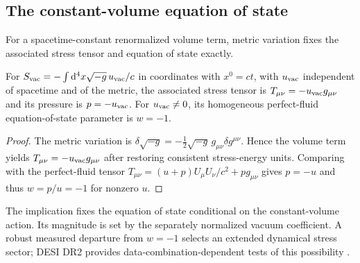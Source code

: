 \subsection{The constant-volume equation of state}
\label{sec:consistency}
For a spacetime-constant renormalized volume term, metric variation fixes the associated stress tensor and equation of state exactly.
\begin{proposition}\label{prop:w}
For $S_{\rm vac}=-\int\mathrm{d}^4x\sqrt{-g}\,u_{\rm vac}/c$ in coordinates with $x^0=ct$, with $u_{\rm vac}$ independent of spacetime and of the metric, the associated stress tensor is $T_{\mu\nu}=-u_{\rm vac}g_{\mu\nu}$ and its pressure is $p=-u_{\rm vac}$. For $u_{\rm vac}\ne0$, its homogeneous perfect-fluid equation-of-state parameter is $w=-1$.
\end{proposition}
\begin{proof}
The metric variation is $\delta\sqrt{-g}=-\tfrac12\sqrt{-g}\,g_{\mu\nu}\delta g^{\mu\nu}$. Hence the volume term yields $T_{\mu\nu}= -u_{\rm vac}g_{\mu\nu}$ after restoring consistent stress-energy units. Comparing with the perfect-fluid tensor $T_{\mu\nu}=(u+p)U_\mu U_\nu/c^2+pg_{\mu\nu}$ gives $p=-u$ and thus $w=p/u=-1$ for nonzero $u$.\end{proof}

The implication fixes the equation of state conditional on the constant-volume action. Its magnitude is set by the separately normalized vacuum coefficient. A robust measured departure from $w=-1$ selects an extended dynamical stress sector; DESI DR2 provides data-combination-dependent tests of this possibility \cite{DESI25}.


